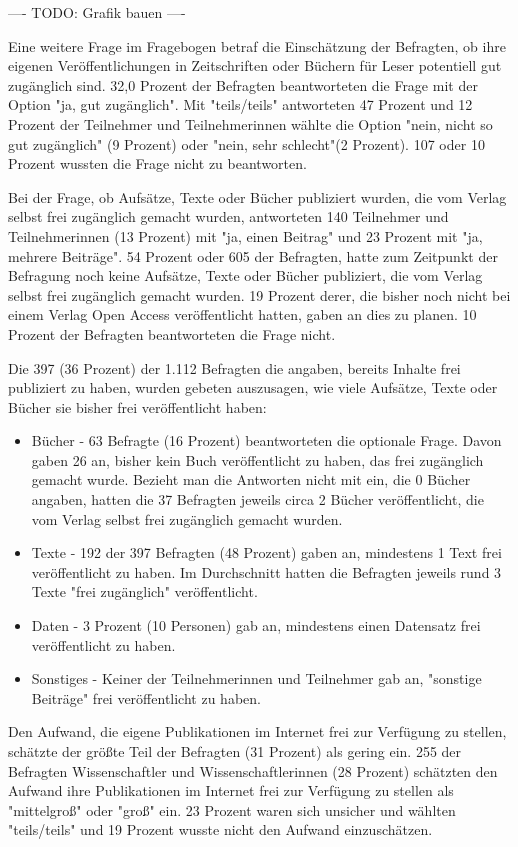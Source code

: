 ---- TODO: Grafik bauen ----

Eine weitere Frage im Fragebogen betraf die Einschätzung der Befragten, ob ihre eigenen Veröffentlichungen in Zeitschriften oder Büchern für Leser potentiell gut zugänglich sind. 32,0 Prozent der Befragten beantworteten die Frage mit der Option "ja, gut zugänglich". Mit "teils/teils" antworteten 47 Prozent und 12 Prozent der Teilnehmer und Teilnehmerinnen wählte die Option "nein, nicht so gut zugänglich" (9 Prozent) oder "nein, sehr schlecht"(2 Prozent). 107 oder 10 Prozent wussten die Frage nicht zu beantworten.

Bei der Frage, ob Aufsätze, Texte oder Bücher publiziert wurden, die vom Verlag selbst frei zugänglich gemacht wurden, antworteten 140 Teilnehmer und Teilnehmerinnen (13 Prozent) mit "ja, einen Beitrag" und 23 Prozent mit "ja, mehrere Beiträge". 54 Prozent oder 605 der Befragten, hatte zum Zeitpunkt der Befragung noch keine Aufsätze, Texte oder Bücher publiziert, die vom Verlag selbst frei zugänglich gemacht wurden.  19 Prozent derer, die bisher noch nicht bei einem Verlag Open Access veröffentlicht hatten, gaben an dies zu planen. 10 Prozent der Befragten beantworteten die Frage nicht.

Die 397 (36 Prozent) der 1.112 Befragten die angaben, bereits Inhalte frei publiziert zu haben, wurden gebeten auszusagen, wie viele Aufsätze, Texte oder Bücher sie bisher frei veröffentlicht haben:
\begin{itemize}
\item Bücher - 63 Befragte (16 Prozent) beantworteten die optionale Frage. Davon gaben 26 an, bisher kein Buch veröffentlicht zu haben, das frei zugänglich gemacht wurde. Bezieht man die Antworten nicht mit ein, die 0 Bücher angaben, hatten die 37 Befragten jeweils circa 2 Bücher veröffentlicht, die vom Verlag selbst frei zugänglich gemacht wurden.
\item Texte - 192 der 397 Befragten (48 Prozent) gaben an, mindestens 1 Text frei veröffentlicht zu haben. Im Durchschnitt hatten die Befragten jeweils rund 3 Texte "frei zugänglich" veröffentlicht.
\item Daten - 3 Prozent (10 Personen) gab an, mindestens einen Datensatz frei veröffentlicht zu haben.
\item Sonstiges - Keiner der Teilnehmerinnen und Teilnehmer gab an, "sonstige Beiträge" frei veröffentlicht zu haben.
\end{itemize}

Den Aufwand, die eigene Publikationen im Internet frei zur Verfügung zu stellen, schätzte der größte Teil der Befragten (31 Prozent) als gering ein. 255 der Befragten Wissenschaftler und Wissenschaftlerinnen (28 Prozent) schätzten den Aufwand ihre Publikationen im Internet frei zur Verfügung zu stellen als "mittelgroß" oder "groß" ein. 23 Prozent waren sich unsicher und wählten "teils/teils" und 19 Prozent wusste nicht den Aufwand einzuschätzen.

